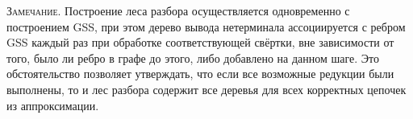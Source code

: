 \textsc{Замечание.} Построение леса разбора осуществляется одновременно с построением GSS, при этом дерево вывода нетерминала ассоциируется с ребром GSS каждый раз при обработке соответствующей свёртки, вне зависимости от того, было ли ребро в графе до этого, либо добавлено на данном шаге. Это обстоятельство позволяет утверждать, что если все возможные редукции были выполнены, то и лес разбора содержит все деревья для всех корректных цепочек из аппроксимации.
